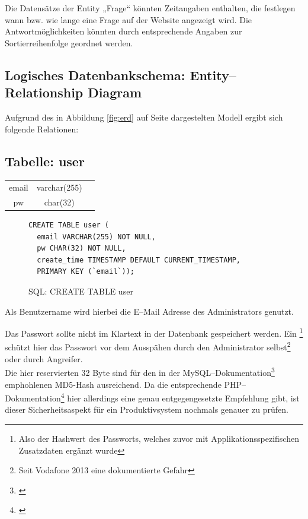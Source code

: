 Die Datensätze der Entity „Frage“ könnten Zeitangaben enthalten, die festlegen wann bzw. wie lange eine Frage auf der Website angezeigt wird. Die Antwortmöglichkeiten könnten durch entsprechende Angaben zur Sortierreihenfolge geordnet werden.

\subsection{Logisches Datenbankschema: Entity--Relationship Diagram}

Aufgrund des in Abbildung \ref{fig:erd} auf Seite \pageref{fig:erd} dargestelten Modell ergibt sich folgende Relationen:


\subsection{Tabelle: user}
\begin{center}
\begin{supertabular}{c|c|c}
\hline
email & varchar(255) &  \\
pw & char(32) &  \\
\end{supertabular}
\end{center}


\begin{figure}[h]
\begin{verbatim}
CREATE TABLE user (
  email VARCHAR(255) NOT NULL,
  pw CHAR(32) NOT NULL,
  create_time TIMESTAMP DEFAULT CURRENT_TIMESTAMP,
  PRIMARY KEY (`email`));
\end{verbatim}
\caption{SQL: CREATE TABLE user}
\label{sql:tbluser}
\end{figure}

Als Benutzername wird hierbei die E--Mail Adresse des Administrators genutzt. 

Das Passwort sollte nicht im Klartext in der Datenbank gespeichert werden. Ein \footnote{Also der Hashwert des Passworts, welches zuvor mit Applikationsspezifischen Zusatzdaten ergänzt wurde} schützt hier das Passwort vor dem Ausspähen durch den Administrator selbst\footnote{Seit Vodafone 2013 eine dokumentierte Gefahr} oder durch Angreifer.\\
Die hier reservierten 32 Byte sind für den in der MySQL--Dokumentation\footnote{\cite{mysql-pcrypt}} emphohlenen MD5-Hash ausreichend. Da die entsprechende PHP--Dokumentation\footnote{\cite{php-pcrypt}} hier allerdings eine genau entgegengesetzte Empfehlung gibt, ist dieser Sicherheitsaspekt für ein Produktivsystem nochmals genauer zu prüfen.

